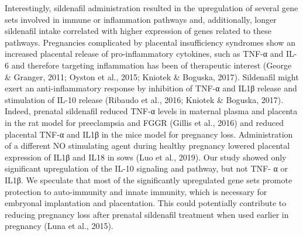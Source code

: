 \documentclass[authordate, empirical]{jote-new-article}
\begin{document}
Interestingly, sildenafil administration resulted in the upregulation of several gene sets involved in immune or inflammation pathways and, additionally, longer sildenafil intake correlated with higher expression of genes related to these pathways. Pregnancies complicated by placental insufficiency syndromes show an increased placental release of pro-inflammatory cytokines, such as TNF-α and IL-6 and therefore targeting inflammation has been of therapeutic interest (George \& Granger, 2011; Oyston et al., 2015; Kniotek \& Boguska, 2017). Sildenafil might exert an anti-inflammatory response by inhibition of TNF-α and IL1β release and stimulation of IL-10 release (Ribaudo et al., 2016; Kniotek \& Boguska, 2017). Indeed, prenatal sildenafil reduced TNF-α levels in maternal plasma and placenta in the rat model for preeclampsia and FGGR (Gillis et al., 2016) and reduced placental TNF-α and IL1β in the mice model for pregnancy loss. Administration of a different NO stimulating agent during healthy pregnancy lowered placental expression of IL1β and IL18 in sows (Luo et al., 2019). Our study showed only significant upregulation of the IL-10 signaling and pathway, but not TNF- α or IL1β. We speculate that most of the significantly upregulated gene sets promote protection to auto-immunity and innate immunity, which is necessary for embryonal implantation and placentation. This could potentially contribute to reducing pregnancy loss after prenatal sildenafil treatment when used earlier in pregnancy (Luna et al., 2015).
\end{document}
